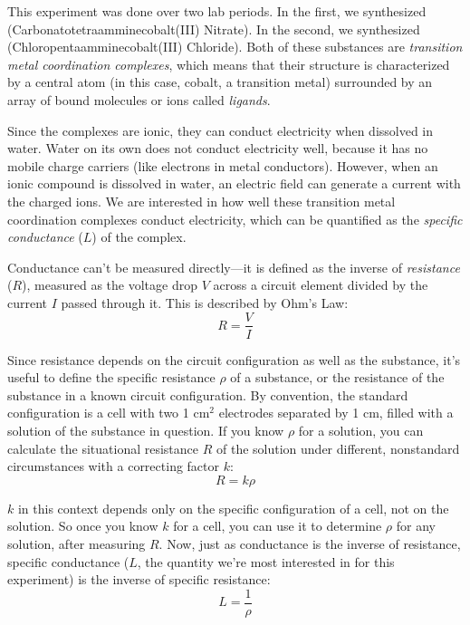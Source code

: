 \documentclass{article}
\begin{document}
This experiment was done over two lab periods. In the first, we synthesized  (Carbonatotetraamminecobalt(III) Nitrate). In the second, we synthesized  (Chloropentaamminecobalt(III) Chloride). Both of these substances are  \textit{transition metal coordination complexes}, which means that their structure is characterized by a central atom (in this case, cobalt, a transition metal) surrounded by an array of bound molecules or ions called \textit{ligands}.

Since the complexes are ionic, they can conduct electricity when dissolved in water. Water on its own does not conduct electricity well, because it has no mobile charge carriers (like electrons in metal conductors). However, when an ionic compound is dissolved in water, an electric field can generate a current with the charged ions. We are interested in how well these transition metal coordination complexes conduct electricity, which can be quantified as the \textit{specific conductance} ($L$) of the complex.

Conductance can't be measured directly---it is defined as the inverse of \textit{resistance} ($R$), measured as the voltage drop $V$ across a circuit element divided by the current $I$ passed through it. This is described by Ohm's Law:
\begin{equation}\label{Ohm's Law}
R = \frac{V}{I}
\end{equation}

Since resistance depends on the circuit configuration as well as the substance, it's useful to define the specific resistance $\rho$ of a substance, or the resistance of the substance in a known circuit configuration. By convention, the standard configuration is a cell with two 1 cm$^2$ electrodes separated by 1 cm, filled with a solution of the substance in question. If you know $\rho$ for a solution, you can calculate the situational resistance $R$ of the solution under different, nonstandard circumstances with a correcting factor $k$:
\begin{equation}\label{Situational Resistance}
R = k\rho
\end{equation}

$k$ in this context depends only on the specific configuration of a cell, not on the solution. So once you know $k$ for a cell, you can use it to determine $\rho$ for any solution, after measuring $R$. Now, just as conductance is the inverse of resistance, specific conductance ($L$, the quantity we're most interested in for this experiment) is the inverse of specific resistance:
\[L = \frac{1}{\rho}\]
\end{document}
